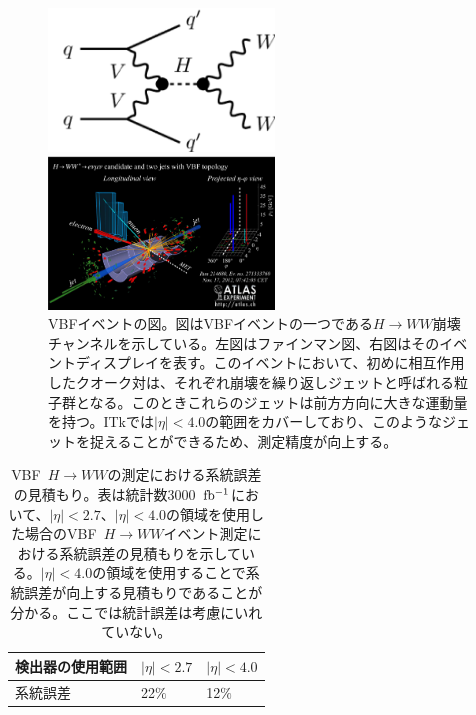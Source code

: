 \begin{figure}[bpt]
  \begin{minipage}{0.5\hsize}
    \begin{center}
    \includegraphics[width=60mm]{./VBF_fainman.png}
    \end{center}
  \end{minipage}
  \begin{minipage}{0.5\hsize}
    \begin{center}
    \includegraphics[width=60mm]{./VBF_event_display.png}
    \end{center}
  \end{minipage}
  \caption[VBFイベントの図]{VBFイベントの図\cite{1-8}。図はVBFイベントの一つである$H\rightarrow WW$崩壊チャンネルを示している。左図はファインマン図、右図はそのイベントディスプレイを表す。このイベントにおいて、初めに相互作用したクオーク対は、それぞれ崩壊を繰り返しジェットと呼ばれる粒子群となる。このときこれらのジェットは前方方向に大きな運動量を持つ。ITkでは$|\eta|<4.0$の範囲をカバーしており、このようなジェットを捉えることができるため、測定精度が向上する。}
  \label{VBF_image}
\end{figure}

\begin{table}[bpt]
\begin{center}
\caption[VBF~$H\rightarrow WW$の測定における系統誤差の見積もり]{VBF~$H\rightarrow WW$の測定における系統誤差の見積もり。表は統計数3000~$\rm{fb^{-1}}$において、$|\eta| <2.7$、$|\eta| <4.0$の領域を使用した場合のVBF~$H\rightarrow WW$イベント測定における系統誤差の見積もりを示している。$|\eta| <4.0$の領域を使用することで系統誤差が向上する見積もりであることが分かる。ここでは統計誤差は考慮にいれていない。}
\label{VBF_uncertainty}
  \begin{tabular}{|lll|} \hline
    検出器の使用範囲 & $|\eta| <2.7 $ & $|\eta| < 4.0 $ \\ \hline
    系統誤差 & 22$\%$ & 12$\%$ \\ \hline
  \end{tabular}
\end{center}
\end{table}

